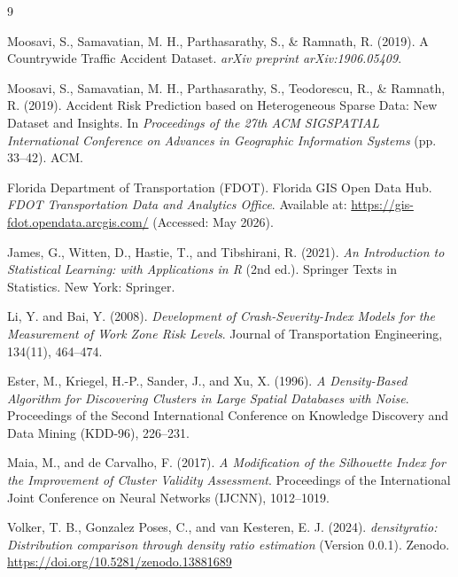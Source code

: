 \documentclass[conference]{IEEEtran}
\begin{document}
\begin{thebibliography}{9}
	
	
Moosavi, S., Samavatian, M. H., Parthasarathy, S., \& Ramnath, R. (2019). 
\newblock A Countrywide Traffic Accident Dataset. 
\newblock \textit{arXiv preprint arXiv:1906.05409}.

Moosavi, S., Samavatian, M. H., Parthasarathy, S., Teodorescu, R., \& Ramnath, R. (2019). 
\newblock Accident Risk Prediction based on Heterogeneous Sparse Data: New Dataset and Insights. 
\newblock In \textit{Proceedings of the 27th ACM SIGSPATIAL International Conference on Advances in Geographic Information Systems} (pp. 33--42). ACM.

Florida Department of Transportation (FDOT). 
\newblock Florida GIS Open Data Hub. 
\newblock \textit{FDOT Transportation Data and Analytics Office}. 
\newblock Available at: \url{https://gis-fdot.opendata.arcgis.com/} (Accessed: May 2026).


James, G., Witten, D., Hastie, T., and Tibshirani, R. (2021). 
\textit{An Introduction to Statistical Learning: with Applications in R} (2nd ed.). 
Springer Texts in Statistics. New York: Springer.

Li, Y. and Bai, Y. (2008).
\textit{Development of Crash-Severity-Index Models for the Measurement of Work Zone Risk Levels}.
Journal of Transportation Engineering, 134(11), 464–474.

Ester, M., Kriegel, H.-P., Sander, J., and Xu, X. (1996).
\textit{A Density-Based Algorithm for Discovering Clusters in Large Spatial Databases with Noise}.
Proceedings of the Second International Conference on Knowledge Discovery and Data Mining (KDD-96), 226–231.

Maia, M., and de Carvalho, F. (2017).
\textit{A Modification of the Silhouette Index for the Improvement of Cluster Validity Assessment}.
Proceedings of the International Joint Conference on Neural Networks (IJCNN), 1012–1019.

Volker, T. B., Gonzalez Poses, C., and van Kesteren, E. J. (2024).
\textit{densityratio: Distribution comparison through density ratio estimation} (Version 0.0.1).
Zenodo. \url{https://doi.org/10.5281/zenodo.13881689}


\end{thebibliography}
\end{document}
